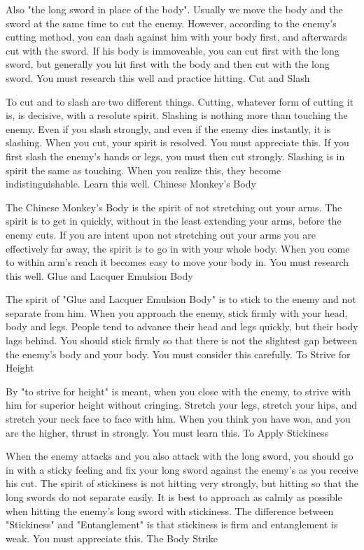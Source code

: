 Also "the long sword in place of the body". Usually we move the body and the sword at the same time to cut the enemy. However, according to the enemy's cutting method, you can dash against him with your body first, and afterwards cut with the sword. If his body is immoveable, you can cut first with the long sword, but generally you hit first with the body and then cut with the long sword. You must research this well and practice hitting.
Cut and Slash

To cut and to slash are two different things. Cutting, whatever form of cutting it is, is decisive, with a resolute spirit. Slashing is nothing more than touching the enemy. Even if you slash strongly, and even if the enemy dies instantly, it is slashing. When you cut, your spirit is resolved. You must appreciate this. If you first slash the enemy's hands or legs, you must then cut strongly. Slashing is in spirit the same as touching. When you realize this, they become indistinguishable. Learn this well.
Chinese Monkey's Body

The Chinese Monkey's Body is the spirit of not stretching out your arms. The spirit is to get in quickly, without in the least extending your arms, before the enemy cuts. If you are intent upon not stretching out your arms you are effectively far away, the spirit is to go in with your whole body. When you come to within arm's reach it becomes easy to move your body in. You must research this well.
Glue and Lacquer Emulsion Body

The spirit of "Glue and Lacquer Emulsion Body" is to stick to the enemy and not separate from him. When you approach the enemy, stick firmly with your head, body and legs. People tend to advance their head and legs quickly, but their body lags behind. You should stick firmly so that there is not the slightest gap between the enemy's body and your body. You must consider this carefully.
To Strive for Height

By "to strive for height" is meant, when you close with the enemy, to strive with him for superior height without cringing. Stretch your legs, stretch your hips, and stretch your neck face to face with him. When you think you have won, and you are the higher, thrust in strongly. You must learn this.
To Apply Stickiness

When the enemy attacks and you also attack with the long sword, you should go in with a sticky feeling and fix your long sword against the enemy's as you receive his cut. The spirit of stickiness is not hitting very strongly, but hitting so that the long swords do not separate easily. It is best to approach as calmly as possible when hitting the enemy's long sword with stickiness. The difference between "Stickiness" and "Entanglement" is that stickiness is firm and entanglement is weak. You must appreciate this.
The Body Strike

